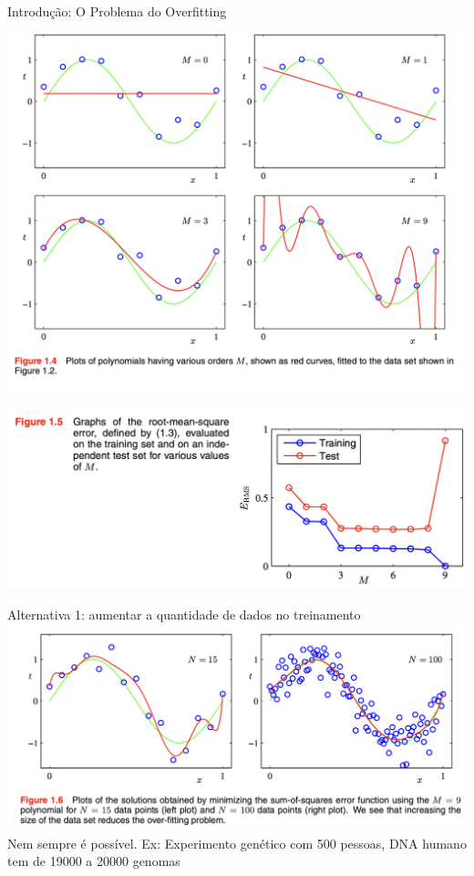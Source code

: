 \documentclass{beamer}
\begin{document}
\begin{frame}{Introdução: O Problema do Overfitting}
\centering
\includegraphics[width=\textwidth,height=0.8\textheight,keepaspectratio]{imgs/bishop_example/1.png}
\end{frame}

\begin{frame}
\centering
\includegraphics[width=\textwidth,height=0.8\textheight,keepaspectratio]{imgs/bishop_example/2.png}
\end{frame}

\begin{frame}{Alternativa 1: aumentar a quantidade de dados no treinamento}
\centering
\includegraphics[width=\textwidth,height=0.8\textheight,keepaspectratio]{imgs/bishop_example/3.png}
Nem sempre é possível. Ex: Experimento genético com 500 pessoas, DNA humano tem de 19000 a 20000 genomas
\end{frame}
\end{document}
